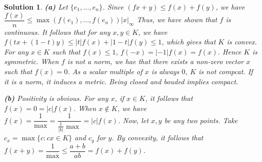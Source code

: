 \documentclass{article} %
\theoremstyle{quest}
\newtheorem*{solution}{Solution}
\begin{document}
\begin{solution} 
\textbf{(a)}
Let $\{e_1,...,e_n\}$. Since $(fx+y) \leq f(x) + f(y)$, we have $\dfrac{f(x)}{n} \leq \max(f(e_1),
...,f(e_n))|x|_{\infty}$ Thus, we have shown that $f$ is continuous. It follows that
for any $x,y \in K$, we have $f(tx + (1-t)y) \leq |t|f(x) + |1-t|f(y) \leq 1$, which gives that
$K$ is convex. For any $x \in K$ such that $f(x) \leq 1$, $f(-x) = |-1|f(x) = f(x)$. Hence $K$
is symmetric. When $f$ is not a norm, we hae that there exists a non-zero vector $x$ such that
$f(x) = 0$. As a scalar multiple of $x$ is always $0$, $K$ is not compcat.
If it is a norm, it induces a metric. Being closed and bouded implies compact.   

\bigskip

\textbf{(b)}
Positivity is obvious. For any $x$, if $x \in K$, it follows that $f(x) = 0 = |c|f(x)$.
When $x \not\in K$, we have $f(x) = \dfrac{1}{\max} = \dfrac{1}{\frac{1}{|k|}\max} = |c|f(x)$.
Now, let $x,y$ be any two points. Take $c_x = \max\{ c: cx \in K\}$ and $c_y$ for $y$. By convexity,
it follows that $f(x+y) = \dfrac{1}{\max} \leq \dfrac{a+b}{ab} = f(x) + f(y)$.
 
\newpage


\end{solution}
\end{document}
